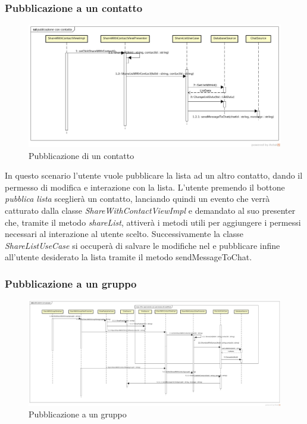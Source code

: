 \subsubsection{Pubblicazione a un contatto}

\label{Pubblicazione di un contatto}
\begin{figure}[H]
	\centering
	\includegraphics[width=\textwidth]{Sezioni/Diagrammi/App/publicazione_con_contatto.jpg}
	\caption{Pubblicazione di un contatto}
	
\end{figure}
In questo scenario l'utente vuole pubblicare la lista ad un altro contatto, dando il permesso di modifica e interazione con la lista. L'utente premendo il bottone \textit{pubblica lista} sceglierà un contatto, lanciando quindi un evento che verrà catturato dalla classe \textit{ShareWithContactViewImpl} e demandato al suo presenter che, tramite il metodo \textit{shareList}, attiverà i metodi utili per aggiungere i permessi necessari al interazione al utente scelto. Successivamente la classe \textit{ShareListUseCase} si occuperà di salvare le modifiche nel  e pubblicare infine all'utente desiderato la lista tramite il metodo {sendMessageToChat}.


\subsubsection{Pubblicazione a un gruppo}

\label{Pubblicazione a un gruppo}
\begin{figure}[H]
	\centering
	\includegraphics[width=\textwidth]{Sezioni/Diagrammi/App/publicazione_con_gruppo.jpg}
	\caption{Pubblicazione a un gruppo}
	
\end{figure}

